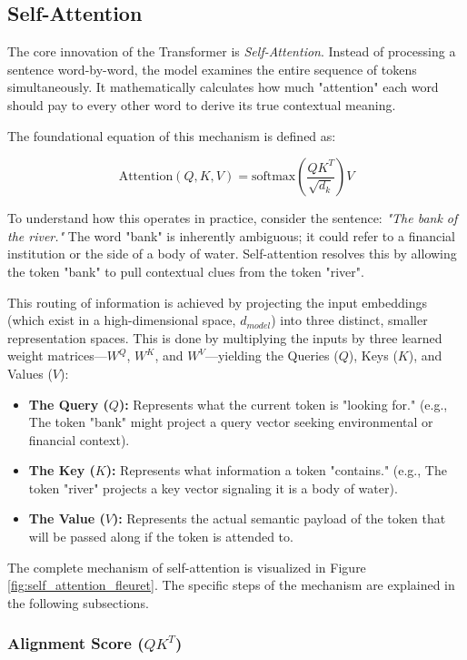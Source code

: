 \subsection*{Self-Attention}

The core innovation of the Transformer is \emph{Self-Attention}. Instead of processing a sentence word-by-word, the model examines the entire sequence of tokens simultaneously. It mathematically calculates how much "attention" each word should pay to every other word to derive its true contextual meaning.

The foundational equation of this mechanism is defined as:

$$ \text{Attention}(Q, K, V) = \text{softmax}\left(\frac{QK^T}{\sqrt{d_k}}\right)V $$

To understand how this operates in practice, consider the sentence: \textit{"The bank of the river."} The word "bank" is inherently ambiguous; it could refer to a financial institution or the side of a body of water. Self-attention resolves this by allowing the token "bank" to pull contextual clues from the token "river".

This routing of information is achieved by projecting the input embeddings (which exist in a high-dimensional space, $d_{model}$) into three distinct, smaller representation spaces. This is done by multiplying the inputs by three learned weight matrices---$W^Q$, $W^K$, and $W^V$---yielding the Queries ($Q$), Keys ($K$), and Values ($V$):

\begin{itemize}
    \item \textbf{The Query ($Q$):} Represents what the current token is "looking for." (e.g., The token "bank" might project a query vector seeking environmental or financial context).
    \item \textbf{The Key ($K$):} Represents what information a token "contains." (e.g., The token "river" projects a key vector signaling it is a body of water).
    \item \textbf{The Value ($V$):} Represents the actual semantic payload of the token that will be passed along if the token is attended to.
\end{itemize}

The complete mechanism of self-attention is visualized in Figure \ref{fig:self_attention_fleuret}. The specific steps of the mechanism are explained in the following subsections.

\subsubsection*{Alignment Score ($QK^T$)}

